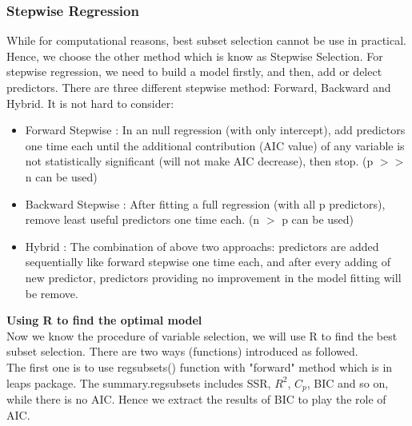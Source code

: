 \documentclass[a4paper]{article}
\begin{document}
\subsubsection{Stepwise Regression}
While for computational reasons, best subset selection cannot be use in practical. Hence, we choose the other method which is know as Stepwise Selection. For stepwise regression, we need to build a model firstly, and then, add or delect predictors. There are three different stepwise method: Forward, Backward and Hybrid. It is not hard to consider:\\ 
\begin{itemize}
    \item Forward Stepwise : In an null regression (with only intercept), add predictors one time each until the additional contribution (AIC value) of any variable is not statistically significant (will not make AIC decrease), then stop. (p $>>$ n can be used)
    \item Backward Stepwise : After fitting a full regression (with all p predictors), remove least useful predictors one time each. (n $>$ p can be used)
    \item Hybrid : The combination of above two approachs: predictors are added sequentially like forward stepwise one time each, and after every adding of new predictor, predictors providing no improvement in the model fitting will be remove.
\end{itemize}

\noindent
\textbf{Using R to find the optimal model}\\
Now we know the procedure of variable selection, we will use R to find the best subset selection.  There are two ways (functions) introduced as followed.\\

\noindent
The first one is to use regsubsets() function with "forward" method which is in leaps package. The summary.regsubsets includes SSR, $R^2$, $C_p$, BIC and so on, while there is no AIC. Hence we extract the results of BIC to play the role of AIC.\\
\end{document}
